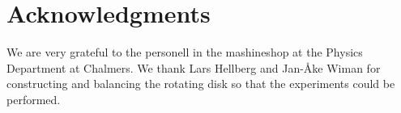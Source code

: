 \documentclass[11pt,towcolumn, swedish, english]{article}
\begin{document}
\section*{Acknowledgments}
We are very grateful to the personell in the mashineshop at the
Physics Department at Chalmers. We thank Lars Hellberg and Jan-Åke
Wiman for constructing and balancing the rotating disk so that the
experiments could be performed. 





\end{document}
